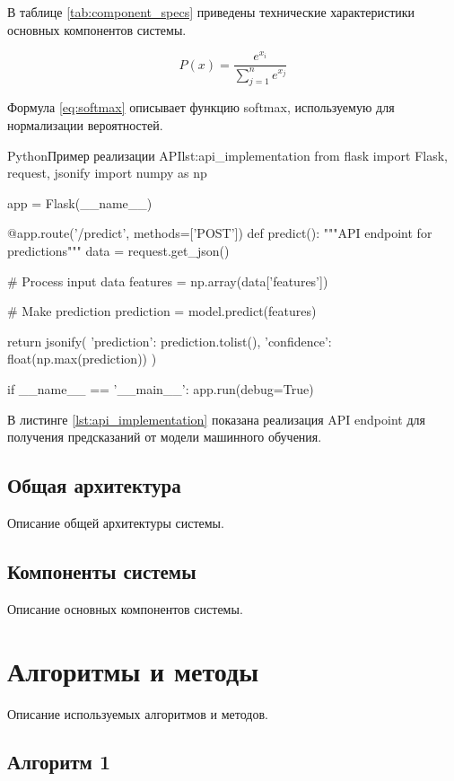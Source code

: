 В таблице \ref{tab:component_specs} приведены технические характеристики основных компонентов системы.

\begin{equation}
P(x) = \frac{e^{x_i}}{\sum_{j=1}^{n} e^{x_j}}
\label{eq:softmax}
\end{equation}

Формула \ref{eq:softmax} описывает функцию softmax, используемую для нормализации вероятностей.

\begin{CodeBlock}{Python}{Пример реализации API}{lst:api_implementation}
from flask import Flask, request, jsonify
import numpy as np

app = Flask(__name__)

@app.route('/predict', methods=['POST'])
def predict():
    """API endpoint for predictions"""
    data = request.get_json()
    
    # Process input data
    features = np.array(data['features'])
    
    # Make prediction
    prediction = model.predict(features)
    
    return jsonify({
        'prediction': prediction.tolist(),
        'confidence': float(np.max(prediction))
    })

if __name__ == '__main__':
    app.run(debug=True)
\end{CodeBlock}

В листинге \ref{lst:api_implementation} показана реализация API endpoint для получения предсказаний от модели машинного обучения.

\subsection{Общая архитектура}

Описание общей архитектуры системы.

\subsection{Компоненты системы}

Описание основных компонентов системы.

\section{Алгоритмы и методы}

Описание используемых алгоритмов и методов.

\subsection{Алгоритм 1}

